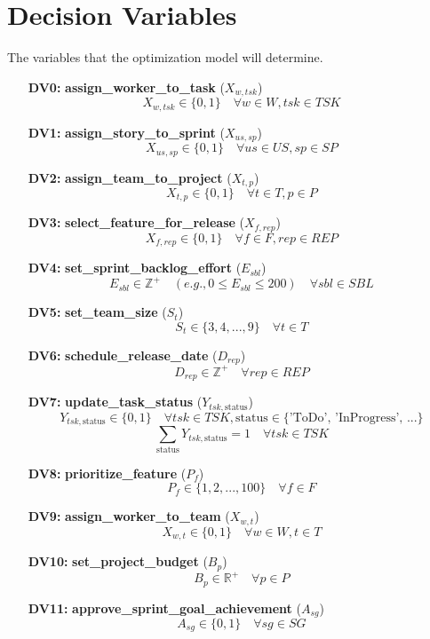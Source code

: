 \documentclass[11pt, a4paper]{article}
\begin{document}
\section{Decision Variables}
The variables that the optimization model will determine.

\begin{itemize}
    \item[\textbf{DV0:}] \textbf{assign\_worker\_to\_task} ($X_{w,tsk}$)
    $$ X_{w,tsk} \in \{0, 1\} \quad \forall w \in W, tsk \in TSK $$
    \item[\textbf{DV1:}] \textbf{assign\_story\_to\_sprint} ($X_{us,sp}$)
    $$ X_{us,sp} \in \{0, 1\} \quad \forall us \in US, sp \in SP $$
    \item[\textbf{DV2:}] \textbf{assign\_team\_to\_project} ($X_{t,p}$)
    $$ X_{t,p} \in \{0, 1\} \quad \forall t \in T, p \in P $$
    \item[\textbf{DV3:}] \textbf{select\_feature\_for\_release} ($X_{f,rep}$)
    $$ X_{f,rep} \in \{0, 1\} \quad \forall f \in F, rep \in REP $$
    \item[\textbf{DV4:}] \textbf{set\_sprint\_backlog\_effort} ($E_{sbl}$)
    $$ E_{sbl} \in \mathbb{Z}^+ \quad (e.g., 0 \le E_{sbl} \le 200) \quad \forall sbl \in SBL $$
    \item[\textbf{DV5:}] \textbf{set\_team\_size} ($S_{t}$)
    $$ S_t \in \{3, 4, ..., 9\} \quad \forall t \in T $$
    \item[\textbf{DV6:}] \textbf{schedule\_release\_date} ($D_{rep}$)
    $$ D_{rep} \in \mathbb{Z}^+ \quad \forall rep \in REP $$
    \item[\textbf{DV7:}] \textbf{update\_task\_status} ($Y_{tsk, \text{status}}$)
    $$ Y_{tsk, \text{status}} \in \{0, 1\} \quad \forall tsk \in TSK, \text{status} \in \{\text{'ToDo', 'InProgress', ...}\} $$
    $$ \sum_{\text{status}} Y_{tsk, \text{status}} = 1 \quad \forall tsk \in TSK $$
    \item[\textbf{DV8:}] \textbf{prioritize\_feature} ($P_f$)
    $$ P_f \in \{1, 2, ..., 100\} \quad \forall f \in F $$
    \item[\textbf{DV9:}] \textbf{assign\_worker\_to\_team} ($X_{w,t}$)
    $$ X_{w,t} \in \{0, 1\} \quad \forall w \in W, t \in T $$
    \item[\textbf{DV10:}] \textbf{set\_project\_budget} ($B_p$)
    $$ B_p \in \mathbb{R}^+ \quad \forall p \in P $$
    \item[\textbf{DV11:}] \textbf{approve\_sprint\_goal\_achievement} ($A_{sg}$)
    $$ A_{sg} \in \{0, 1\} \quad \forall sg \in SG $$
\end{itemize}
\end{document}
